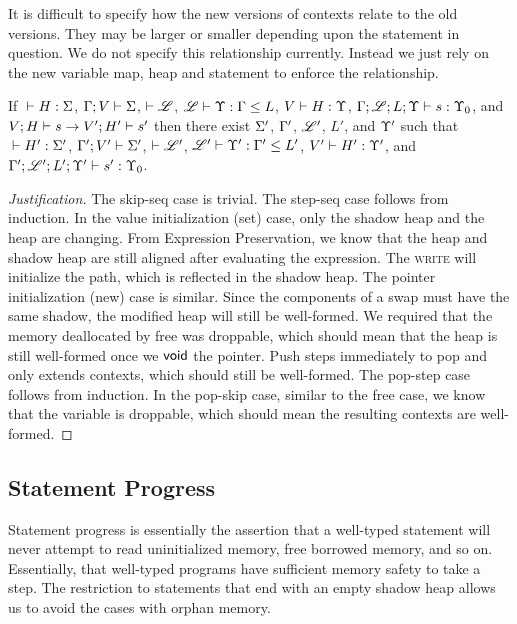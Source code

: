 It is difficult to specify how the new versions of contexts relate to the old versions.
They may be larger or smaller depending upon the statement in question.
We do not specify this relationship currently.
Instead we just rely on the new variable map, heap and statement to enforce
the relationship.

\begin{conj}
  If ${} \vdash {H} : {\Sigma}$, $\Gamma;V\vdash\Sigma$, $\vdash\mathscr{L}$, ${\mathscr{L}} \vdash {\Upsilon} : {\Gamma} \leq {L}$,
  ${V} \vdash {H} : {\Upsilon}$, ${\Gamma;\mathscr{L};L;\Upsilon} \vdash {s} : {\Upsilon_0}$, and ${V};{H}\vdash{s}\to{V'};{H'}\vdash{s'}$
  then there exist $\Sigma'$, $\Gamma'$, $\mathscr{L}'$, $L'$, and $\Upsilon'$ such that
  ${} \vdash {H'} : {\Sigma'}$, $\Gamma';V'\vdash\Sigma'$, $\vdash\mathscr{L}'$, ${\mathscr{L}'} \vdash {\Upsilon'} : {\Gamma'} \leq {L'}$,
  ${V'} \vdash {H'} : {\Upsilon'}$, and ${\Gamma';\mathscr{L}';L';\Upsilon'} \vdash {s'} : {\Upsilon_0}$.

\end{conj}

\begin{proof}[Justification]
  The skip-seq case is trivial.
  The step-seq case follows from induction.
  In the value initialization (set) case, only the shadow heap and the heap are changing.
  From Expression Preservation, we know that the heap and shadow heap are still aligned
  after evaluating the expression. The \textsc{write} will initialize the path, which
  is reflected in the shadow heap.
  The pointer initialization (new) case is similar.
  Since the components of a swap must have the same shadow, the modified heap will
  still be well-formed.
  We required that the memory deallocated by \textsf{free} was droppable, which
  should mean that the heap is still well-formed once we $\mathsf{void}$ the pointer.
  Push steps immediately to pop and only extends contexts, which should still be well-formed.
  The pop-step case follows from induction.
  In the pop-skip case, similar to the \textsf{free} case, we know that the variable
  is droppable, which should mean the resulting contexts are well-formed.
\end{proof}

\subsection*{Statement Progress}
Statement progress is essentially the assertion that a well-typed statement will
never attempt to read uninitialized memory, free borrowed memory, and so on.
Essentially, that well-typed programs have sufficient memory safety to take a step.
The restriction to statements that end with an empty shadow heap allows us
to avoid the cases with orphan memory.

